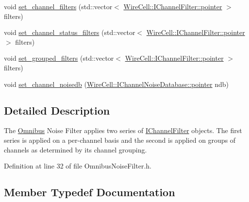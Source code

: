 \begin{DoxyCompactItemize}
void \hyperlink{class_wire_cell_1_1_sig_proc_1_1_omnibus_noise_filter_ae85bd8dd4a3582fa2122008a67f8edec}{set\+\_\+channel\+\_\+filters} (std\+::vector$<$ \hyperlink{class_wire_cell_1_1_i_component_a744b962ee9489c909f1b0f1fe2533798}{Wire\+Cell\+::\+I\+Channel\+Filter\+::pointer} $>$ filters)
\item 
void \hyperlink{class_wire_cell_1_1_sig_proc_1_1_omnibus_noise_filter_ac180c268b1f1424c3f7db20732b2c718}{set\+\_\+channel\+\_\+status\+\_\+filters} (std\+::vector$<$ \hyperlink{class_wire_cell_1_1_i_component_a744b962ee9489c909f1b0f1fe2533798}{Wire\+Cell\+::\+I\+Channel\+Filter\+::pointer} $>$ filters)
\item 
void \hyperlink{class_wire_cell_1_1_sig_proc_1_1_omnibus_noise_filter_ad4f98e813bc0067aef019484617c9440}{set\+\_\+grouped\+\_\+filters} (std\+::vector$<$ \hyperlink{class_wire_cell_1_1_i_component_a744b962ee9489c909f1b0f1fe2533798}{Wire\+Cell\+::\+I\+Channel\+Filter\+::pointer} $>$ filters)
\item 
void \hyperlink{class_wire_cell_1_1_sig_proc_1_1_omnibus_noise_filter_a113bab32abdbe75ef47187e65007140c}{set\+\_\+channel\+\_\+noisedb} (\hyperlink{class_wire_cell_1_1_i_component_a744b962ee9489c909f1b0f1fe2533798}{Wire\+Cell\+::\+I\+Channel\+Noise\+Database\+::pointer} ndb)
\end{DoxyCompactItemize}


\subsection{Detailed Description}
The \hyperlink{class_wire_cell_1_1_sig_proc_1_1_omnibus}{Omnibus} Noise Filter applies two series of \hyperlink{class_wire_cell_1_1_i_channel_filter}{I\+Channel\+Filter} objects. The first series is applied on a per-\/channel basis and the second is applied on groups of channels as determined by its channel grouping. 

Definition at line 32 of file Omnibus\+Noise\+Filter.\+h.



\subsection{Member Typedef Documentation}
\mbox{\label{class_wire_cell_1_1_sig_proc_1_1_omnibus_noise_filter_a9f1abbd77ac8a8b21fcc71a9578d650e}} 
